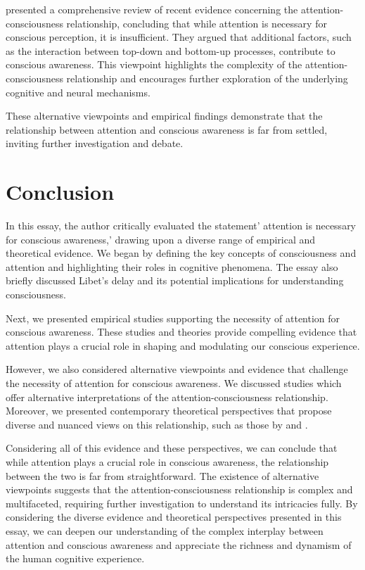 \documentclass[10pt]{article}
\begin{document}
\begin{sloppypar}
  \cite{noah_recent_2020} presented a comprehensive review of recent evidence concerning the attention-consciousness relationship, concluding that while attention is necessary for conscious perception, it is insufficient. They argued that additional factors, such as the interaction between top-down and bottom-up processes, contribute to conscious awareness. This viewpoint highlights the complexity of the attention-consciousness relationship and encourages further exploration of the underlying cognitive and neural mechanisms.

  These alternative viewpoints and empirical findings demonstrate that the relationship between attention and conscious awareness is far from settled, inviting further investigation and debate.

  \section{Conclusion}
  \label{sec:conclusion}

  In this essay, the author critically evaluated the statement’ attention is necessary for conscious awareness,’ drawing upon a diverse range of empirical and theoretical evidence. We began by defining the key concepts of consciousness and attention and highlighting their roles in cognitive phenomena. The essay also briefly discussed Libet’s delay and its potential implications for understanding consciousness.

  Next, we presented empirical studies supporting the necessity of attention for conscious awareness. These studies and theories provide compelling evidence that attention plays a crucial role in shaping and modulating our conscious experience.

  However, we also considered alternative viewpoints and evidence that challenge the necessity of attention for conscious awareness. We discussed studies which offer alternative interpretations of the attention-consciousness relationship. Moreover, we presented contemporary theoretical perspectives that propose diverse and nuanced views on this relationship, such as those by \cite{montemayor_types_2021} and \cite{noah_recent_2020}.

  Considering all of this evidence and these perspectives, we can conclude that while attention plays a crucial role in conscious awareness, the relationship between the two is far from straightforward. The existence of alternative viewpoints suggests that the attention-consciousness relationship is complex and multifaceted, requiring further investigation to understand its intricacies fully. By considering the diverse evidence and theoretical perspectives presented in this essay, we can deepen our understanding of the complex interplay between attention and conscious awareness and appreciate the richness and dynamism of the human cognitive experience.

  \pagebreak
  \singlespacing %
  
  

\end{sloppypar}
\end{document}
